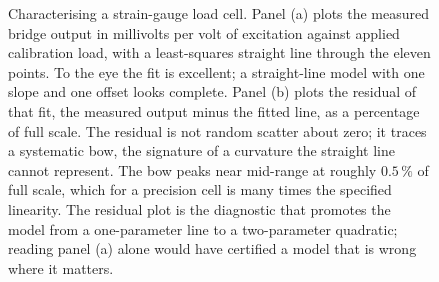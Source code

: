 \begin{figure}[htbp]
{\begin{tikzpicture}
\end{tikzpicture}%
}%
\caption[A load cell characterised from data]{Characterising a
strain-gauge load cell. Panel (a) plots the measured bridge output in
millivolts per volt of excitation against applied calibration load,
with a least-squares straight line through the eleven points. To the
eye the fit is excellent; a straight-line model with one slope and
one offset looks complete. Panel (b) plots the residual of that fit,
the measured output minus the fitted line, as a percentage of full
scale. The residual is not random scatter about zero; it traces a
systematic bow, the signature of a curvature the straight line
cannot represent. The bow peaks near mid-range at roughly $0.5\,\%$
of full scale, which for a precision cell is many times the
specified linearity. The residual plot is the diagnostic that
promotes the model from a one-parameter line to a two-parameter
quadratic; reading panel (a) alone would have certified a model that
is wrong where it matters.}
\label{fig:vol02:ch02:loadcell-characterisation}
\end{figure}

